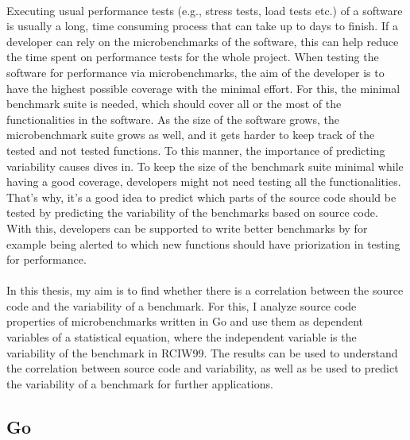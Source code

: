 \documentclass{seal_thesis}
\begin{document}
\\
Executing usual performance tests (e.g., stress tests, load tests etc.) of a software is usually a long, time consuming process that can take up to days to finish\cite{Laaber:2018:EOS:3196398.3196407}. If a developer can rely on the microbenchmarks of the software, this can help reduce the time spent on performance tests for the whole project. When testing the software for performance via microbenchmarks, the aim of the developer is to have the highest possible coverage  with the minimal effort. For this, the minimal benchmark suite is needed, which should cover all or the most of the functionalities in the software. As the size of the software grows, the microbenchmark suite grows as well, and it gets harder to keep track of the tested and not tested functions. To this manner, the importance of predicting variability causes dives in. To keep the size of the benchmark suite minimal while having a good coverage, developers might not need testing all the functionalities. That's why, it's a good idea to predict which parts of the source code should be tested by predicting the variability of the benchmarks based on source code. With this, developers can be supported to write better benchmarks by for example being alerted to which new functions should have priorization in testing for performance.\\
\\
In this thesis, my aim is to find whether there is a correlation between the source code and the variability of a benchmark. For this, I analyze source code properties of microbenchmarks written in Go and use them as dependent variables of a statistical equation,  where the independent variable is the variability of the benchmark in RCIW99. The results can be used to understand the correlation between source code and variability, as well as be used to predict the variability of a benchmark for further applications.\\

\subsection{Go}
\end{document}

